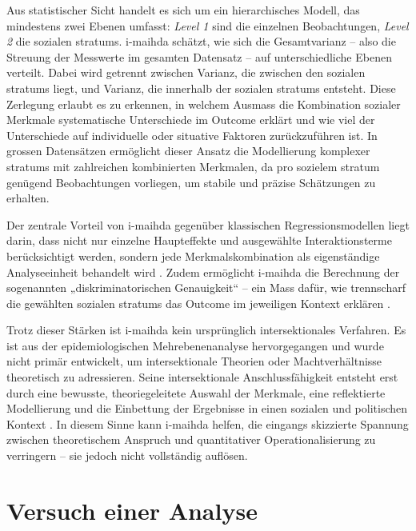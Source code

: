 Aus statistischer Sicht handelt es sich um ein hierarchisches Modell, das mindestens zwei Ebenen umfasst: \textit{Level 1} sind die einzelnen Beobachtungen, \textit{Level 2} die sozialen \glspl{stratum}. \gls{i-maihda} schätzt, wie sich die Gesamtvarianz -- also die Streuung der Messwerte im gesamten Datensatz -- auf unterschiedliche Ebenen verteilt. Dabei wird getrennt zwischen Varianz, die zwischen den sozialen \glspl{stratum} liegt, und Varianz, die innerhalb der sozialen \glspl{stratum} entsteht. Diese Zerlegung erlaubt es zu erkennen, in welchem Ausmass die Kombination sozialer Merkmale systematische Unterschiede im Outcome erklärt und wie viel der Unterschiede auf individuelle oder situative Faktoren zurückzuführen ist. In grossen Datensätzen ermöglicht dieser Ansatz die Modellierung komplexer \glspl{stratum} mit zahlreichen kombinierten Merkmalen, da pro sozielem \gls{stratum} genügend Beobachtungen vorliegen, um stabile und präzise Schätzungen zu erhalten.

Der zentrale Vorteil von \gls{i-maihda} gegenüber klassischen Regressionsmodellen liegt darin, dass nicht nur einzelne Haupteffekte und ausgewählte Interaktionsterme berücksichtigt werden, sondern jede Merkmalskombination als eigenständige Analyseeinheit behandelt wird \parencite{hancockWhenMultiplicationDoesnt2007, bowlegInvitedReflectionQuantifying2016}. Zudem ermöglicht \gls{i-maihda} die Berechnung der sogenannten „diskriminatorischen Genauigkeit“ -- ein Mass dafür, wie trennscharf die gewählten sozialen \glspl{stratum} das Outcome im jeweiligen Kontext erklären \parencite{evansTutorialConductingIntersectional2024}.

Trotz dieser Stärken ist \gls{i-maihda} kein ursprünglich intersektionales Verfahren. Es ist aus der epidemiologischen Mehrebenenanalyse hervorgegangen und wurde nicht primär entwickelt, um intersektionale Theorien oder Machtverhältnisse theoretisch zu adressieren. Seine intersektionale Anschlussfähigkeit entsteht erst durch eine bewusste, theoriegeleitete Auswahl der Merkmale, eine reflektierte Modellierung und die Einbettung der Ergebnisse in einen sozialen und politischen Kontext \parencite{grossModellingIntersectionalityQuantitative2023}. In diesem Sinne kann \gls{i-maihda} helfen, die eingangs skizzierte Spannung zwischen theoretischem Anspruch und quantitativer Operationalisierung zu verringern -- sie jedoch nicht vollständig auflösen.

\section{Versuch einer Analyse}

